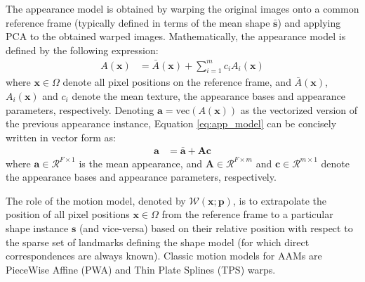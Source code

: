 The appearance model is obtained by warping the original images onto a common reference frame (typically defined in terms of the mean shape $\mathbf{\bar{s}}$) and applying PCA to the obtained warped images. Mathematically, the appearance model is defined by the following expression:
\begin{equation}
	\begin{aligned}
		A(\mathbf{x}) & = \bar{A}(\mathbf{x}) + \sum_{i=1}^m c_i A_i(\mathbf{x})
	\end{aligned}
    \label{eq:app_model}
\end{equation}
where $\mathbf{x} \in \Omega$ denote all pixel positions on the reference frame, and $\bar{A}(\mathbf{x})$, $A_i(\mathbf{x})$ and $c_i$ denote the mean texture, the appearance bases and appearance parameters, respectively. Denoting $\mathbf{a} = \text{vec}(A(\mathbf{x}))$ as the vectorized version of the previous appearance instance, Equation \ref{eq:app_model} can be concisely written in vector form as:
\begin{equation}
	\begin{aligned}
		\mathbf{a} & = \mathbf{\bar{a}} + \mathbf{A} \mathbf{c}
	\end{aligned}
    \label{eq:app_model_vec}
\end{equation}
where $\mathbf{a} \in \mathcal{R}^{F \times 1}$ is the mean appearance, and $\mathbf{A} \in  \mathcal{R}^{F \times  m}$ and $\mathbf{c} \in \mathcal{R}^{m \times 1}$ denote the appearance bases and appearance parameters, respectively.

The role of the motion model, denoted by $\mathcal{W}(\mathbf{x}; \mathbf{p})$, is to extrapolate the position of all pixel positions $\mathbf{x} \in \Omega$ from the reference frame to a particular shape instance $\mathbf{s}$ (and vice-versa) based on their relative position with respect to the sparse set of landmarks defining the shape model (for which direct correspondences are always known). Classic motion models for AAMs are PieceWise Affine (PWA) \cite{Cootes2004,Matthews2004} and Thin Plate Splines (TPS) \cite{Cootes2004,Papandreou2008} warps. 

